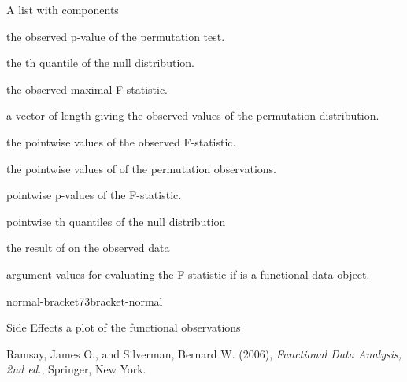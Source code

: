\begin{Value}
A list with components
\begin{ldescription}
\item[\code{pval}] the observed p-value of the permutation test.
\item[\code{qval}] the th quantile of the null distribution.
\item[\code{Fobs}] the observed maximal F-statistic.
\item[\code{Fnull}] a vector of length  giving the observed values of the
permutation distribution.

\item[\code{Fvals}] the pointwise values of the observed F-statistic.
\item[\code{Fnullvals}] the pointwise values of of the permutation observations.

\item[\code{pvals.pts}] pointwise p-values of the F-statistic.
\item[\code{qvals.pts}] pointwise th quantiles of the null distribution

\item[\code{fRegressList}] the result of  on the observed data

\item[\code{argvals}] argument values for evaluating the F-statistic if  is
a functional data object.

\end{ldescription}

normal-bracket73bracket-normal
\end{Value}
\begin{Section}{Side Effects}
a plot of the functional observations
\end{Section}
\begin{Source}\relax
Ramsay, James O., and Silverman, Bernard W. (2006), \emph{Functional
Data Analysis, 2nd ed.}, Springer, New York.
\end{Source}
\begin{SeeAlso}\relax
{}
\end{SeeAlso}
